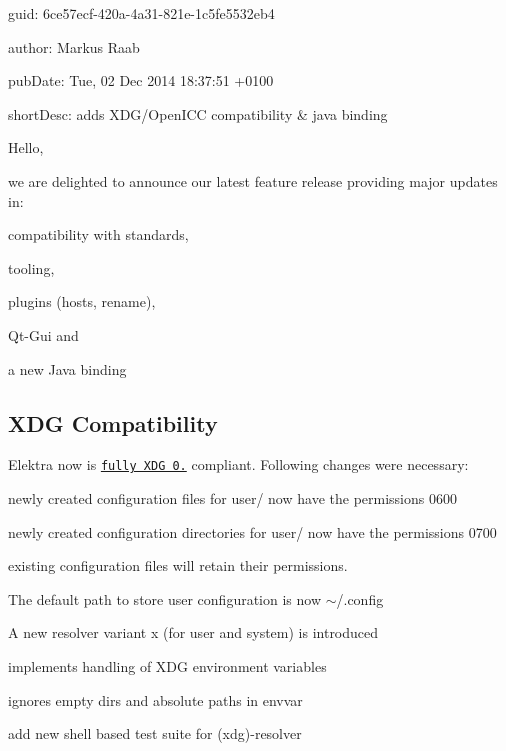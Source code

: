
\begin{DoxyItemize}
\item guid\+: 6ce57ecf-\/420a-\/4a31-\/821e-\/1c5fe5532eb4
\item author\+: Markus Raab
\item pub\+Date\+: Tue, 02 Dec 2014 18\+:37\+:51 +0100
\item short\+Desc\+: adds X\+D\+G/\+Open\+I\+CC compatibility \& java binding
\end{DoxyItemize}

Hello,

we are delighted to announce our latest feature release providing major updates in\+:


\begin{DoxyItemize}
\item compatibility with standards,
\item tooling,
\item plugins (hosts, rename),
\item Qt-\/\+Gui and
\item a new Java binding
\end{DoxyItemize}

\subsection*{X\+DG Compatibility}

Elektra now is \href{http://standards.freedesktop.org/basedir-spec/basedir-spec-0.8.html}{\tt fully X\+DG 0.} compliant. Following changes were necessary\+:


\begin{DoxyItemize}
\item newly created configuration files for user/ now have the permissions 0600
\item newly created configuration directories for user/ now have the permissions 0700
\item existing configuration files will retain their permissions.
\item The default path to store user configuration is now $\sim$/.config
\item A new resolver variant x (for user and system) is introduced
\begin{DoxyItemize}
\item implements handling of X\+DG environment variables
\item ignores empty dirs and absolute paths in envvar
\end{DoxyItemize}
\item add new shell based test suite for (xdg)-\/resolver
\end{DoxyItemize}

